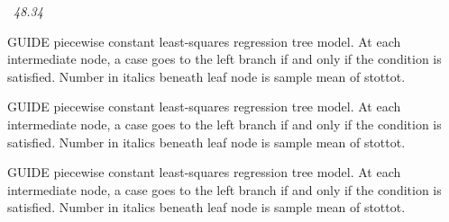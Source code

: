 \documentclass[12pt]{article}
\begin{document}
 \begin{center}
    ~{\textit{48.34}}
 \end{center}
GUIDE piecewise constant least-squares regression tree model.
At each intermediate node, a case goes to the left branch 
  if and only if the condition is satisfied.
Number in italics beneath leaf node is sample mean of stottot.
 \begin{center}
 \end{center}
GUIDE piecewise constant least-squares regression tree model.
At each intermediate node, a case goes to the left branch 
  if and only if the condition is satisfied.
Number in italics beneath leaf node is sample mean of stottot.
 \begin{center}
 \end{center}
GUIDE piecewise constant least-squares regression tree model.
At each intermediate node, a case goes to the left branch 
  if and only if the condition is satisfied.
Number in italics beneath leaf node is sample mean of stottot.
\end{document}

